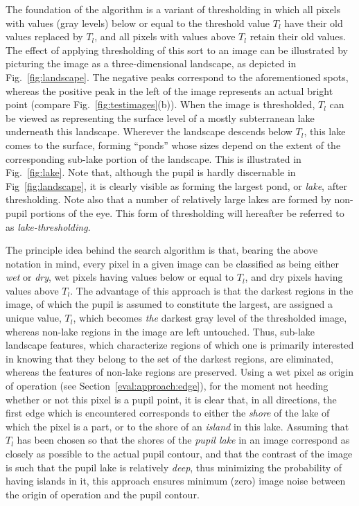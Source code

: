 The foundation of the algorithm is a variant of thresholding in which
all pixels with values (gray levels) below or equal to the threshold
value $T_{l}$ have their old values replaced by $T_{l}$, and all
pixels with values above $T_{l}$ retain their old values.  The effect
of applying thresholding of this sort to an image can be illustrated
by picturing the image as a three-dimensional landscape, as depicted
in Fig.~\ref{fig:landscape}.  The negative peaks correspond to the
aforementioned spots, whereas the positive peak in the left of the
image represents an actual bright point (compare
Fig.~\ref{fig:testimages}(b)).  When the image is thresholded, $T_{l}$
can be viewed as representing the surface level of a mostly
subterranean lake underneath this landscape.  Wherever the landscape
descends below $T_{l}$, this lake comes to the surface, forming
``ponds'' whose sizes depend on the extent of the corresponding
sub-lake portion of the landscape.  This is illustrated in
Fig.~\ref{fig:lake}.  Note that, although the pupil is hardly
discernable in Fig~\ref{fig:landscape}, it is clearly visible as
forming the largest pond, or {\em lake\/}, after thresholding.  Note
also that a number of relatively large lakes are formed by non-pupil
portions of the eye.  This form of thresholding will hereafter be
referred to as {\em lake-thresholding\/}.

The principle idea behind the search algorithm is that, bearing the
above notation in mind, every pixel in a given image can be classified
as being either {\em wet\/} or {\em dry\/}, wet pixels having values
below or equal to $T_{l}$, and dry pixels having values above $T_{l}$.
The advantage of this approach is that the darkest regions in the
image, of which the pupil is assumed to constitute the largest, are
assigned a unique value, $T_{l}$, which becomes {\em the\/} darkest
gray level of the thresholded image, whereas non-lake regions in the
image are left untouched.  Thus, sub-lake landscape features, which
characterize regions of which one is primarily interested in knowing
that they belong to the set of the darkest regions, are eliminated,
whereas the features of non-lake regions are preserved.  Using a wet
pixel as origin of operation (see Section~\ref{eval:approach:edge}),
for the moment not heeding whether or not this pixel is a pupil point,
it is clear that, in all directions, the first edge which is
encountered corresponds to either the {\em shore\/} of the lake of
which the pixel is a part, or to the shore of an {\em island\/} in
this lake.  Assuming that $T_{l}$ has been chosen so that the shores
of the {\em pupil lake\/} in an image correspond as closely as
possible to the actual pupil contour, and that the contrast of the
image is such that the pupil lake is relatively {\em deep\/}, thus
minimizing the probability of having islands in it, this approach
ensures minimum (zero) image noise between the origin of operation and
the pupil contour.

